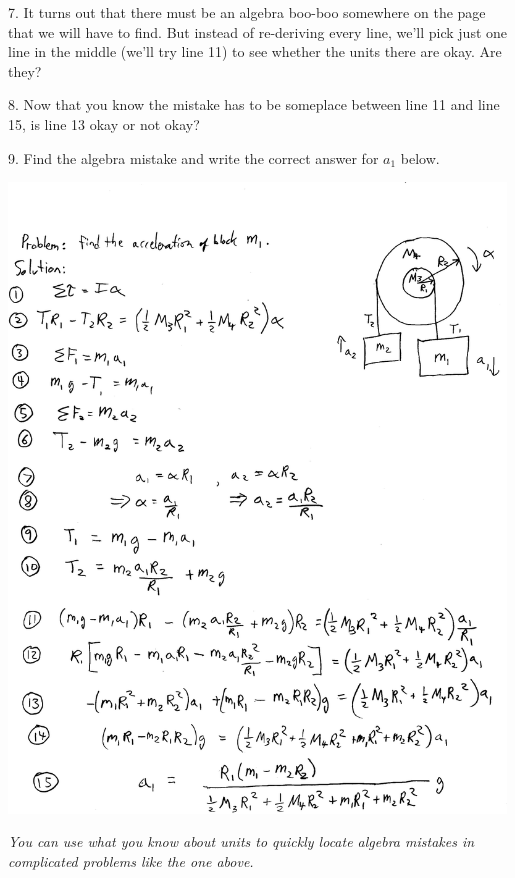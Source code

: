 7. It turns out that there must be an algebra boo-boo somewhere on the page that we will have to find.  But instead of re-deriving every line, we'll pick just one line in the middle (we'll try line 11) to see whether the units there are okay.  Are they?
\vspace{0.4in}

8. Now that you know the mistake has to be someplace between line 11 and line 15, is line 13 okay or not okay?
\vspace{0.2in}

9. Find the algebra mistake and write the correct answer for $a_1$ below.
\vspace{0.5in}

\newpage

\begin{center}
\includegraphics[width=0.99\textwidth]{check_your_units/find_the_error_using_units2.pdf}
\end{center}

\textit{You can use what you know about units to quickly locate algebra mistakes in complicated problems like the one above.}



